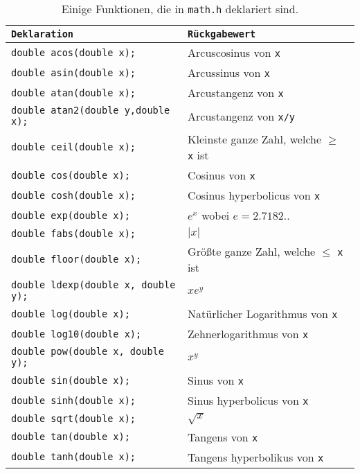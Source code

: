 \begin{table}[t]
  \centering
  \begin{tabular}{|l l|}
    \hline
    \texttt{Deklaration} & \texttt{Rückgabewert} \\
    \hline
    \texttt{double acos(double x);} & Arcuscosinus von \texttt{x}\\
    \texttt{double asin(double x);} & Arcussinus von \texttt{x}\\
    \texttt{double atan(double x);} & Arcustangenz von \texttt{x}\\
    \texttt{double atan2(double y,double x);} & Arcustangenz von \texttt{x/y}\\
    \texttt{double ceil(double x);} & Kleinste ganze Zahl, welche $\ge$ \texttt{x} ist \\
    \texttt{double cos(double x);} & Cosinus von \texttt{x}\\
    \texttt{double cosh(double x);} & Cosinus hyperbolicus von \texttt{x}\\
    \texttt{double exp(double x);} & $e^{x}$ wobei $e=2.7182..$\\
    \texttt{double fabs(double x);} & $\vert x\vert$\\
    \texttt{double floor(double x);} & Größte ganze Zahl, welche $\le$ \texttt{x} ist \\
    \texttt{double ldexp(double x, double y);} & $xe^{y}$ \\
    \texttt{double log(double x);} & Natürlicher Logarithmus von \texttt{x}\\
    \texttt{double log10(double x);} & Zehnerlogarithmus von \texttt{x}\\
    \texttt{double pow(double x, double y);} & $x^{y}$\\
    \texttt{double sin(double x);} & Sinus von \texttt{x}\\
    \texttt{double sinh(double x);} & Sinus hyperbolicus von \texttt{x}\\
    \texttt{double sqrt(double x);} & $\sqrt{x}$\\
    \texttt{double tan(double x);} & Tangens von \texttt{x}\\
    \texttt{double tanh(double x);} & Tangens hyperbolikus von \texttt{x}\\
    \hline
  \end{tabular}
  \caption{Einige Funktionen, die in \texttt{math.h} deklariert sind.\label{math}}
\end{table}

